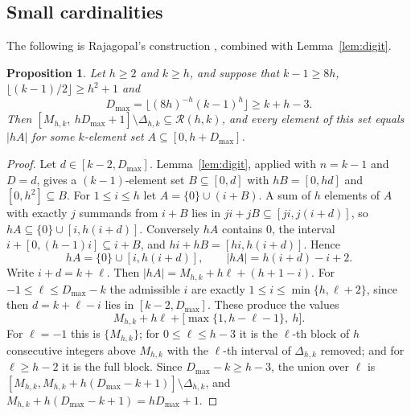 \documentclass[11pt]{amsart}
\newtheorem{proposition}[theorem]{Proposition}
\theoremstyle{definition}
\theoremstyle{remark}
\numberwithin{equation}{section}
\newcommand{\R}{\mathcal{R}}
\begin{document}
\subsection{Small cardinalities}
The following is Rajagopal's construction \cite[proof of Proposition~4.1]{Raj26}, combined with Lemma~\ref{lem:digit}.

\begin{proposition}\label{prop:osmall}
Let $h\ge 2$ and $k\ge h$, and suppose that $k-1\ge 8h$, $\lfloor(k-1)/2\rfloor\ge h^2+1$ and
\[
D_{\max}=\bigl\lfloor(8h)^{-h}(k-1)^h\bigr\rfloor\ge k+h-3.
\]
Then $[M_{h,k},\ hD_{\max}+1]\setminus\Delta_{h,k}\subseteq\R(h,k)$, and every element of this set equals $|hA|$ for some $k$-element set $A\subseteq[0,h+D_{\max}]$.
\end{proposition}

\begin{proof}
Let $d\in[k-2,D_{\max}]$. Lemma~\ref{lem:digit}, applied with $n=k-1$ and $D=d$, gives a $(k-1)$-element set $B\subseteq[0,d]$ with $hB=[0,hd]$ and $[0,h^2]\subseteq B$. For $1\le i\le h$ let $A=\{0\}\cup(i+B)$. A sum of $h$ elements of $A$ with exactly $j$ summands from $i+B$ lies in $ji+jB\subseteq[ji,j(i+d)]$, so $hA\subseteq\{0\}\cup[i,h(i+d)]$. Conversely $hA$ contains $0$, the interval $i+[0,(h-1)i]\subseteq i+B$, and $hi+hB=[hi,h(i+d)]$. Hence
\[
hA=\{0\}\cup[i,h(i+d)],\qquad |hA|=h(i+d)-i+2.
\]
Write $i+d=k+\ell$. Then $|hA|=M_{h,k}+h\ell+(h+1-i)$. For $-1\le\ell\le D_{\max}-k$ the admissible $i$ are exactly $1\le i\le\min\{h,\ell+2\}$, since then $d=k+\ell-i$ lies in $[k-2,D_{\max}]$. These produce the values
\[
M_{h,k}+h\ell+\bigl[\max\{1,h-\ell-1\},\ h\bigr].
\]
For $\ell=-1$ this is $\{M_{h,k}\}$; for $0\le\ell\le h-3$ it is the $\ell$-th block of $h$ consecutive integers above $M_{h,k}$ with the $\ell$-th interval of $\Delta_{h,k}$ removed; and for $\ell\ge h-2$ it is the full block. Since $D_{\max}-k\ge h-3$, the union over $\ell$ is $[M_{h,k},M_{h,k}+h(D_{\max}-k+1)]\setminus\Delta_{h,k}$, and $M_{h,k}+h(D_{\max}-k+1)=hD_{\max}+1$.
\end{proof}
\end{document}
